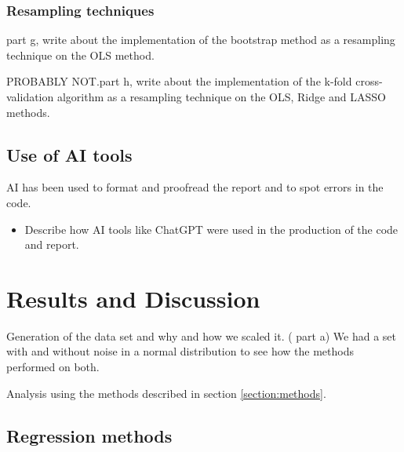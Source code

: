 \documentclass[amssymb,twocolumn,aps]{revtex4}
\begin{document}
\subsubsection{Resampling techniques}
part g, write about the implementation of the bootstrap method as a resampling technique on the OLS method.

PROBABLY NOT.part h, write about the implementation of the k-fold cross-validation algorithm as a resampling technique on the OLS, Ridge and LASSO methods.

\subsection{Use of AI tools}
	AI has been used to format and proofread the report and to spot errors in the code.
\begin{itemize}
    \item Describe how AI tools like ChatGPT were used in the production of the code and report.
\end{itemize}

\newpage

\section{Results and Discussion}\label{section:results}

Generation of the data set and why and how we scaled it. ( part a)
We had a set with and without noise in a normal distribution to see how the methods performed on both.


Analysis using the methods described in section \ref{section:methods}.

\subsection{Regression methods}
\end{document}
